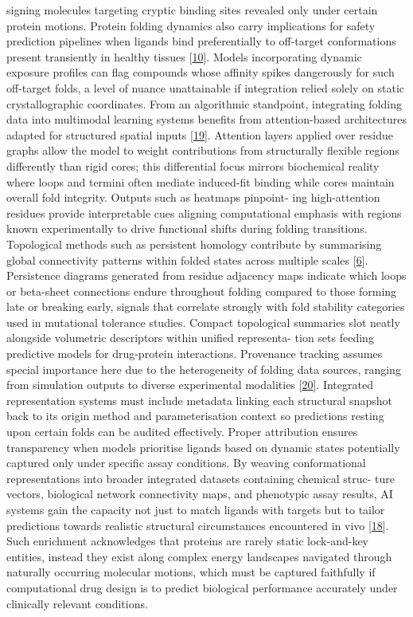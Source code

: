 \documentclass[
]{article}
\begin{document}
signing molecules targeting cryptic binding sites revealed only under
certain protein motions. Protein folding dynamics also carry
implications for safety prediction pipelines when ligands bind
preferentially to off-target conformations present transiently in
healthy tissues {[}\hyperref[_bookmark50]{10}{]}. Models incorporating
dynamic exposure profiles can flag compounds whose affinity spikes
dangerously for such off-target folds, a level of nuance unattainable if
integration relied solely on static crystallographic coordinates. From
an algorithmic standpoint, integrating folding data into multimodal
learning systems benefits from attention-based architectures adapted for
structured spatial inputs {[}\hyperref[_bookmark59]{19}{]}. Attention
layers applied over residue graphs allow the model to weight
contributions from structurally flexible regions differently than rigid
cores; this differential focus mirrors biochemical reality where loops
and termini often mediate induced-fit binding while cores maintain
overall fold integrity. Outputs such as heatmaps pinpoint- ing
high-attention residues provide interpretable cues aligning
computational emphasis with regions known experimentally to drive
functional shifts during folding transitions. Topological methods such
as persistent homology contribute by summarising global connectivity
patterns within folded states across multiple scales
{[}\hyperref[_bookmark46]{6}{]}. Persistence diagrams generated from
residue adjacency maps indicate which loops or beta-sheet connections
endure throughout folding compared to those forming late or breaking
early, signals that correlate strongly with fold stability categories
used in mutational tolerance studies. Compact topological summaries slot
neatly alongside volumetric descriptors within unified representa- tion
sets feeding predictive models for drug-protein interactions. Provenance
tracking assumes special importance here due to the heterogeneity of
folding data sources, ranging from simulation outputs to diverse
experimental modalities {[}\hyperref[_bookmark60]{20}{]}. Integrated
representation systems must include metadata linking each structural
snapshot back to its origin method and parameterisation context so
predictions resting upon certain folds can be audited effectively.
Proper attribution ensures transparency when models prioritise ligands
based on dynamic states potentially captured only under specific assay
conditions. By weaving conformational representations into broader
integrated datasets containing chemical struc- ture vectors, biological
network connectivity maps, and phenotypic assay results, AI systems gain
the capacity not just to match ligands with targets but to tailor
predictions towards realistic structural circumstances encountered in
vivo {[}\hyperref[_bookmark58]{18}{]}. Such enrichment acknowledges that
proteins are rarely static lock-and-key entities, instead they exist
along complex energy landscapes navigated through naturally occurring
molecular motions, which must be captured faithfully if computational
drug design is to predict biological performance accurately under
clinically relevant conditions.
\end{document}
